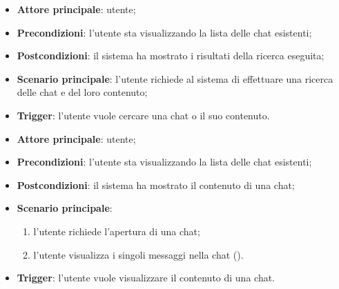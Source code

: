 \documentclass[10pt, a4paper]{article}
\begin{document}
    \begin{itemize}
        \item \textbf{Attore principale}: utente;
        \item \textbf{Precondizioni}: l’utente sta visualizzando la lista delle chat esistenti;
        \item \textbf{Postcondizioni}: il sistema ha mostrato i risultati della ricerca eseguita;
        \item \textbf{Scenario principale}: l’utente richiede al sistema di effettuare una ricerca delle chat e del loro contenuto;
        \item \textbf{Trigger}: l’utente vuole cercare una chat o il suo contenuto.
    \end{itemize}

    \begin{itemize}
        \item \textbf{Attore principale}: utente;
        \item \textbf{Precondizioni}: l’utente sta visualizzando la lista delle chat esistenti;
        \item \textbf{Postcondizioni}: il sistema ha mostrato il contenuto di una chat;
        \item \textbf{Scenario principale}:
            \begin{enumerate}
                \item l’utente richiede l’apertura di una chat;
                \item l'utente visualizza i singoli messaggi nella chat ().
            \end{enumerate}
        \item \textbf{Trigger}: l’utente vuole visualizzare il contenuto di una chat.
    \end{itemize}
\end{document}
